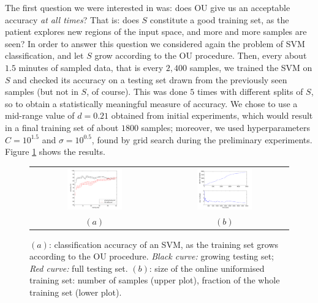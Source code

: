 The first question we were interested in was: does OU give us an
acceptable accuracy \emph{at all times}? That is: does $S$ constitute
a good training set, as the patient explores new regions of the input
space, and more and more samples are seen? In order to answer this
question we considered again the problem of SVM classification, and
let $S$ grow according to the OU procedure. Then, every about $1.5$
minutes of sampled data, that is every $2,400$ samples, we trained the
SVM on $S$ and checked its accuracy on a testing set drawn from the
previously seen samples (but not in $S$, of course). This was done $5$
times with different splits of $S$, so to obtain a statistically
meaningful measure of accuracy. We chose to use a mid-range value of
$d = 0.21$ obtained from initial experiments, which would
result in a final training set of about $1800$ samples; moreover, we
used hyperparameters $C = 10^{1.5}$ and $\sigma = 10^{0.5}$, found by
grid search during the preliminary experiments. Figure \ref{fig:inc}
shows the results.

\begin{figure}[!ht] \centering
  \begin{tabular}{cc}
    \includegraphics[width=0.45\textwidth]{figs/fig_resInc_OU21} &
    \includegraphics[width=0.45\textwidth]{figs/fig_growth_OU21} \\
    $(a)$ & $(b)$ \\
  \end{tabular}
  \caption{$(a)$: classification accuracy of an SVM, as the training set
    grows according to the OU procedure. \emph{Black curve:}
    growing testing set; \emph{Red curve:} full testing set. $(b)$:
    size of the online uniformised training set: number of samples
    (upper plot), fraction of the whole training set (lower plot).}
  \label{fig:inc}
\end{figure}

